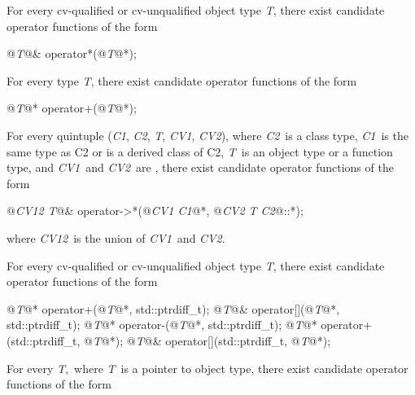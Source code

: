 \documentclass[american]{book}
\begin{document}
\setcounter{Paras}{4}

\pnum
For every cv-qualified or cv-unqualified
 object type
\textit{T}, 
there exist candidate operator functions of the form

\begin{codeblock}
@\textit{T}@&    operator*(@\textit{T}@*);
\end{codeblock}

\setcounter{Paras}{6}

\pnum
For every type
\textit{T}, 
there exist candidate operator functions of the form

\begin{codeblock}
@\textit{T}@*    operator+(@\textit{T}@*);
\end{codeblock}

\setcounter{Paras}{10}
\pnum
For every quintuple
(\textit{C1},
\textit{C2},
\textit{T},
\textit{CV1},
\textit{CV2}),
where
\textit{C2}\ 
is a class type,
\textit{C1}\ 
is the same type as C2 or is a derived class of C2,
\textit{T}\ 
is an
\addedCC{effective}
object type or a function type,
and
\textit{CV1}\ 
and
\textit{CV2}\ 
are
,
there exist candidate operator functions of the form

\begin{codeblock}
@\textit{CV12 T}@& operator->*(@\textit{CV1 C1}@*, @\textit{CV2 T C2}@::*);
\end{codeblock}

where
\textit{CV12}\ 
is the union of
\textit{CV1}\ 
and
\textit{CV2}.

\setcounter{Paras}{12}
\pnum
For every cv-qualified or cv-unqualified
object type
\textit{T},
there exist candidate operator functions of the form

\begin{codeblock}
@\textit{T}@*      operator+(@\textit{T}@*, std::ptrdiff_t);
@\textit{T}@&      operator[](@\textit{T}@*, std::ptrdiff_t);
@\textit{T}@*      operator-(@\textit{T}@*, std::ptrdiff_t);
@\textit{T}@*      operator+(std::ptrdiff_t, @\textit{T}@*);
@\textit{T}@&      operator[](std::ptrdiff_t, @\textit{T}@*);
\end{codeblock}

\pnum
For every 
\textit{T},\
where
\textit{T}\
is a pointer to
\addedCC{effective}
object type,
there exist candidate operator functions of the form
\end{document}
